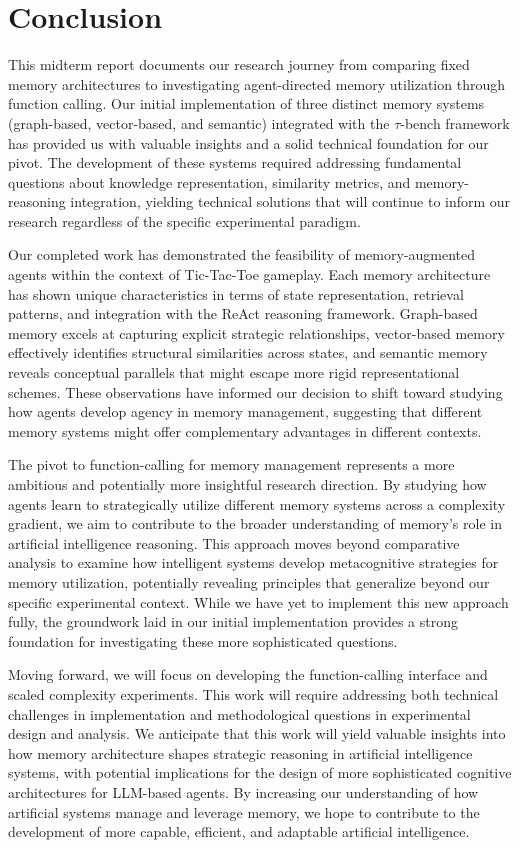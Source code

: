 \documentclass{article}
\begin{document}
\section{Conclusion}

This midterm report documents our research journey from comparing fixed memory architectures to investigating agent-directed memory utilization through function calling. Our initial implementation of three distinct memory systems (graph-based, vector-based, and semantic) integrated with the $\tau$-bench framework has provided us with valuable insights and a solid technical foundation for our pivot. The development of these systems required addressing fundamental questions about knowledge representation, similarity metrics, and memory-reasoning integration, yielding technical solutions that will continue to inform our research regardless of the specific experimental paradigm.

Our completed work has demonstrated the feasibility of memory-augmented agents within the context of Tic-Tac-Toe gameplay. Each memory architecture has shown unique characteristics in terms of state representation, retrieval patterns, and integration with the ReAct reasoning framework. Graph-based memory excels at capturing explicit strategic relationships, vector-based memory effectively identifies structural similarities across states, and semantic memory reveals conceptual parallels that might escape more rigid representational schemes. These observations have informed our decision to shift toward studying how agents develop agency in memory management, suggesting that different memory systems might offer complementary advantages in different contexts.

The pivot to function-calling for memory management represents a more ambitious and potentially more insightful research direction. By studying how agents learn to strategically utilize different memory systems across a complexity gradient, we aim to contribute to the broader understanding of memory's role in artificial intelligence reasoning. This approach moves beyond comparative analysis to examine how intelligent systems develop metacognitive strategies for memory utilization, potentially revealing principles that generalize beyond our specific experimental context. While we have yet to implement this new approach fully, the groundwork laid in our initial implementation provides a strong foundation for investigating these more sophisticated questions.

Moving forward, we will focus on developing the function-calling interface and scaled complexity experiments. This work will require addressing both technical challenges in implementation and methodological questions in experimental design and analysis. We anticipate that this work will yield valuable insights into how memory architecture shapes strategic reasoning in artificial intelligence systems, with potential implications for the design of more sophisticated cognitive architectures for LLM-based agents. By increasing our understanding of how artificial systems manage and leverage memory, we hope to contribute to the development of more capable, efficient, and adaptable artificial intelligence.
\end{document}
